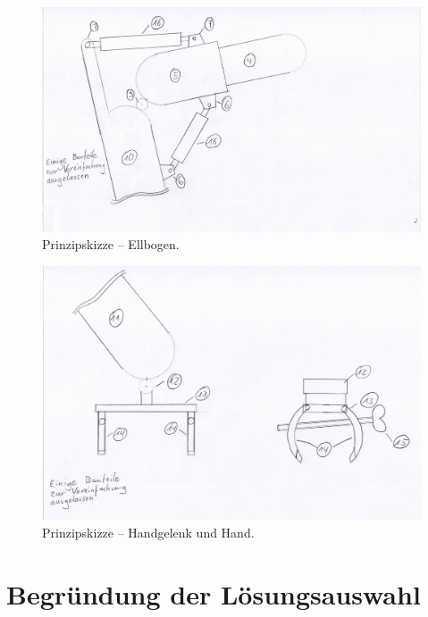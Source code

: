 			\begin{figure}[h]
				\centering
				\includegraphics[width=\textwidth]{Abb/Prinzipskizze_Ellbogen}
				\caption[Prinzipskizze -- Ellbogen]{Prinzipskizze -- Ellbogen.}\label{fig:prinzipskizze-ellbogen}
			\end{figure}

			\begin{figure}[h]
				\centering
				\includegraphics[width=\textwidth]{Abb/Prinzipskizze_Handgelenk_und_Hand}
				\caption[Prinzipskizze -- Handgelenk und Hand]{Prinzipskizze -- Handgelenk und Hand.}\label{fig:prinzipskizze-handgelenk-und-hand}
			\end{figure}

	\section{Begründung der Lösungsauswahl}\label{Begruendung Loesungsauswahl}

